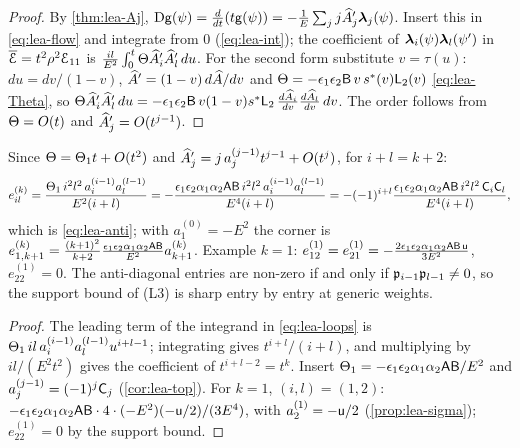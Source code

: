 \begin{proof}
By \cref{thm:lea-Aj}, $\mathrm{D}\mathsf{g}(\psi) = \frac{d}{dt}(t\mathsf{g}(\psi)) = -\frac1E\sum_jj\widehat{A}_j'\boldsymbol{\lambda}_j(\psi)$. Insert this in \eqref{eq:lea-flow} and integrate from $0$ (\eqref{eq:lea-int}); the coefficient of $\boldsymbol{\lambda}_i(\psi)\boldsymbol{\lambda}_l(\psi')$ in $\overline{\mathcal{E}} = t^2\rho^2\mathcal{E}_{11}$ is $\frac{il}{E^2}\int_0^t\Theta\widehat{A}_i'\widehat{A}_l'\,du$. For the second form substitute $v = \tau(u)$: $du = dv/(1-v)$, $\widehat{A}' = (1-v)\,d\widehat{A}/dv$ and $\Theta = -\epsilon_1\epsilon_2\mathsf{B}\,v\,s^{\ast}(v)\mathsf{L}_2(v)$ \eqref{eq:lea-Theta}, so $\Theta\widehat{A}_i'\widehat{A}_l'\,du = -\epsilon_1\epsilon_2\mathsf{B}\,v(1-v)s^{\ast}\mathsf{L}_2\,\frac{d\widehat{A}_i}{dv}\frac{d\widehat{A}_l}{dv}\,dv$. The order follows from $\Theta = O(t)$ and $\widehat{A}_j' = O(t^{j-1})$.
\end{proof}

\begin{cor}
\label{cor:lea-anti}
Since $\Theta = \Theta_1t + O(t^2)$ and $\widehat{A}_j' = j\,a_j^{(j-1)}t^{j-1} + O(t^j)$, for $i+l = k+2$:
\begin{equation}
\label{eq:lea-antidiag}
e_{il}^{(k)} = \frac{\Theta_1\,i^2l^2\,a_i^{(i-1)}a_l^{(l-1)}}{E^2(i+l)} = -\frac{\epsilon_1\epsilon_2\alpha_1\alpha_2\mathsf{A}\mathsf{B}\,i^2l^2\,a_i^{(i-1)}a_l^{(l-1)}}{E^4(i+l)} = -(-1)^{i+l}\frac{\epsilon_1\epsilon_2\alpha_1\alpha_2\mathsf{A}\mathsf{B}\,i^2l^2\,\mathsf{C}_i\mathsf{C}_l}{E^4(i+l)},
\end{equation}
which is \eqref{eq:lea-anti}; with $a_1^{(0)} = -E^2$ the corner is $e_{1,k+1}^{(k)} = \frac{(k+1)^2}{k+2}\frac{\epsilon_1\epsilon_2\alpha_1\alpha_2\mathsf{A}\mathsf{B}}{E^2}a_{k+1}^{(k)}$. Example $k = 1$: $e_{12}^{(1)} = e_{21}^{(1)} = -\frac{2\epsilon_1\epsilon_2\alpha_1\alpha_2\mathsf{A}\mathsf{B}\,\mathsf{u}}{3E^2}$, $e_{22}^{(1)} = 0$. The anti-diagonal entries are non-zero if and only if $\mathfrak{p}_{i-1}\mathfrak{p}_{l-1}\neq 0$, so the support bound of (L3) is sharp entry by entry at generic weights.
\end{cor}

\begin{proof}
The leading term of the integrand in \eqref{eq:lea-loops} is $\Theta_1\,il\,a_i^{(i-1)}a_l^{(l-1)}u^{i+l-1}$; integrating gives $t^{i+l}/(i+l)$, and multiplying by $il/(E^2t^2)$ gives the coefficient of $t^{i+l-2} = t^k$. Insert $\Theta_1 = -\epsilon_1\epsilon_2\alpha_1\alpha_2\mathsf{A}\mathsf{B}/E^2$ and $a_j^{(j-1)} = (-1)^j\mathsf{C}_j$ (\cref{cor:lea-top}). For $k = 1$, $(i,l) = (1,2)$: $-\epsilon_1\epsilon_2\alpha_1\alpha_2\mathsf{A}\mathsf{B}\cdot 4\cdot(-E^2)(-\mathsf{u}/2)/(3E^4)$, with $a_2^{(1)} = -\mathsf{u}/2$ (\cref{prop:lea-sigma}); $e_{22}^{(1)} = 0$ by the support bound.
\end{proof}

